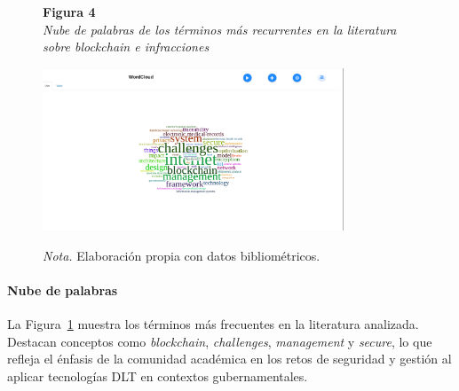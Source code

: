 \begin{figure}[htbp]
    \begin{flushleft}
        \textbf{Figura 4}\\[2em]
        \textit{Nube de palabras de los términos más recurrentes en la literatura sobre blockchain e infracciones}
    \end{flushleft}
    \vspace{1em}
    \centering
    \includegraphics[width=0.8\textwidth]{Images/NubePalabras.png}
    \vspace{2em}
    \begin{flushleft}
        \textit{Nota.} Elaboración propia con datos bibliométricos.
    \end{flushleft}
    \label{fig:nube_palabras}
\end{figure}

\paragraph{Nube de palabras}
La Figura~\ref{fig:nube_palabras} muestra los términos más frecuentes en la literatura analizada. Destacan conceptos como \textit{blockchain}, \textit{challenges}, \textit{management} y \textit{secure}, lo que refleja el énfasis de la comunidad académica en los retos de seguridad y gestión al aplicar tecnologías DLT en contextos gubernamentales.

